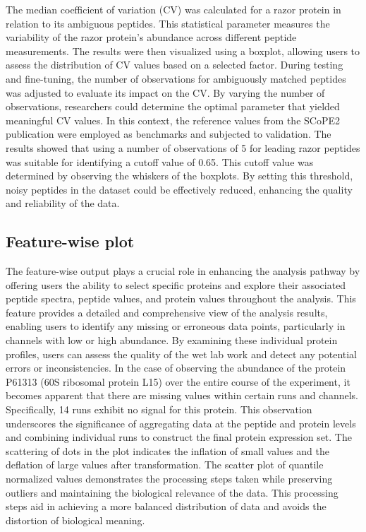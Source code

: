 \documentclass[
  11pt,
]{article}
\begin{document}
The median coefficient of variation (CV) was calculated for a razor
protein in relation to its ambiguous peptides. This statistical
parameter measures the variability of the razor protein's abundance
across different peptide measurements. The results were then visualized
using a boxplot, allowing users to assess the distribution of CV values
based on a selected factor. During testing and fine-tuning, the number
of observations for ambiguously matched peptides was adjusted to
evaluate its impact on the CV. By varying the number of observations,
researchers could determine the optimal parameter that yielded
meaningful CV values. In this context, the reference values from the
SCoPE2 publication \citep{Specht2021} were employed as benchmarks and
subjected to validation. The results showed that using a number of
observations of 5 for leading razor peptides was suitable for
identifying a cutoff value of 0.65. This cutoff value was determined by
observing the whiskers of the boxplots. By setting this threshold, noisy
peptides in the dataset could be effectively reduced, enhancing the
quality and reliability of the data.

\hypertarget{feature-wise-plot}{%
\subsection{Feature-wise plot}\label{feature-wise-plot}}

The feature-wise output plays a crucial role in enhancing the analysis
pathway by offering users the ability to select specific proteins and
explore their associated peptide spectra, peptide values, and protein
values throughout the analysis. This feature provides a detailed and
comprehensive view of the analysis results, enabling users to identify
any missing or erroneous data points, particularly in channels with low
or high abundance. By examining these individual protein profiles, users
can assess the quality of the wet lab work and detect any potential
errors or inconsistencies. In the case of observing the abundance of the
protein P61313 (60S ribosomal protein L15) over the entire course of the
experiment, it becomes apparent that there are missing values within
certain runs and channels. Specifically, 14 runs exhibit no signal for
this protein. This observation underscores the significance of
aggregating data at the peptide and protein levels and combining
individual runs to construct the final protein expression set. The
scattering of dots in the plot indicates the inflation of small values
and the deflation of large values after transformation. The scatter plot
of quantile normalized values demonstrates the processing steps taken
while preserving outliers and maintaining the biological relevance of
the data. This processing steps aid in achieving a more balanced
distribution of data and avoids the distortion of biological meaning.
\end{document}

